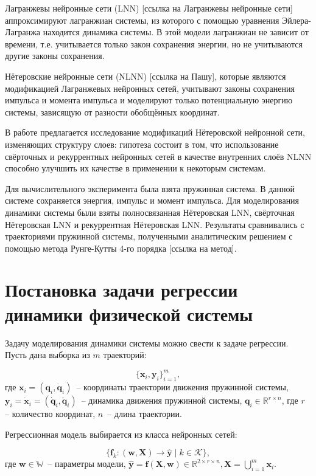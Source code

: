 \documentclass[12pt, twoside]{article}
\begin{document}
    Лагранжевы нейронные сети (LNN) [ссылка на Лагранжевы нейронные сети] аппроксимируют лагранжиан системы, из которого с помощью уравнения Эйлера-Лагранжа находится динамика системы. В этой модели лагранжиан не зависит от времени, т.е. учитывается только закон сохранения энергии, но не учитываются другие законы сохранения.

    Нётеровские нейронные сети (NLNN) [ссылка на Пашу], которые являются модификацией Лагранжевых нейронных сетей, учитывают законы сохранения импульса и момента импульса и моделируют только потенциальную энергию системы, зависящую от разности обобщённых координат. 

    В работе предлагается исследование модификаций Нётеровской нейронной сети, изменяющих структуру слоев: гипотеза состоит в том, что использование свёрточных и рекуррентных нейронных сетей в качестве внутренних слоёв NLNN способно улучшить их качестве в применении к некоторым системам.

    Для вычислительного эксперимента была взята пружинная система. В данной системе сохраняется энергия, импульс и момент импульса. Для моделирования динамики системы были взяты полносвязанная Нётеровская LNN, свёрточная Нётеровская LNN и рекуррентная Нётеровская LNN. Результаты сравнивались с траекториями пружинной системы, полученными аналитическим решением с помощью метода Рунге-Кутты 4-го порядка [ссылка на метод].
    
\section{Постановка задачи регрессии динамики физической системы}

    Задачу моделирования динамики системы можно свести к задаче регрессии. Пусть дана выборка из $m$ траекторий: 

    $$\{\mathbf{x}_i, \mathbf{y}_i\}_{i=1}^m,$$ 
    где $\mathbf{x}_i = (\mathbf{q}_i, \mathbf{\dot{q}}_i)$~--  координаты траектории движения пружинной системы, $\mathbf{{y}}_i = \mathbf{\dot{x}}_i = (\mathbf{\dot{q}}_i, \mathbf{\ddot{q}}_i)$~-- динамика движения пружинной системы, $\mathbf{q}_i \in \mathbb{R}^{r \times n}$, где $r$ -- количество координат, $n$~-- длина траектории.

    Регрессионная модель выбирается из класса нейронных сетей:

    $$\{\mathbf{f}_k\colon(\mathbf{w}, \mathbf{X})\to  \hat{\mathbf{y}} \mid k \in \mathcal{K}\},$$ 
    где $\mathbf{w} \in \mathbb{W}$~-- параметры модели, $\hat{\mathbf{y}} = \mathbf{f} (\mathbf{X},\mathbf{w}) \in \mathbb{R}^{2\times r \times n}, \mathbf{X} = \bigcup_{i=1}^m \mathbf{x}_i$.
\end{document}
